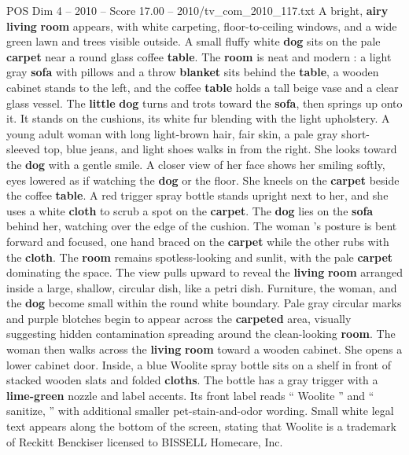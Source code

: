 \begin{textsample}{POS Dim 4 – 2010 – Score 17.00 – 2010/tv\_com\_2010\_117.txt}  \label{ex:f4_pos_029}
A bright, \textbf{airy} \textbf{living} \textbf{room} appears, with white carpeting, floor-to-ceiling windows, and a wide green lawn and trees visible outside.
A small fluffy white \textbf{dog} sits on the pale \textbf{carpet} near a round glass coffee \textbf{table}.
The \textbf{room} is neat and modern : a light gray \textbf{sofa} with pillows and a throw \textbf{blanket} sits behind the \textbf{table}, a wooden cabinet stands to the left, and the coffee \textbf{table} holds a tall beige vase and a clear glass vessel.
The \textbf{little} \textbf{dog} turns and trots toward the \textbf{sofa}, then springs up onto it.
It stands on the cushions, its white fur blending with the light upholstery.
A young adult woman with long light-brown hair, fair skin, a pale gray short-sleeved top, blue jeans, and light shoes walks in from the right.
She looks toward the \textbf{dog} with a gentle smile.
A closer view of her face shows her smiling softly, eyes lowered as if watching the \textbf{dog} or the floor.
She kneels on the \textbf{carpet} beside the coffee \textbf{table}.
A red trigger spray bottle stands upright next to her, and she uses a white \textbf{cloth} to scrub a spot on the \textbf{carpet}.
The \textbf{dog} lies on the \textbf{sofa} behind her, watching over the edge of the cushion.
The woman ’s posture is bent forward and focused, one hand braced on the \textbf{carpet} while the other rubs with the \textbf{cloth}.
The \textbf{room} remains spotless-looking and sunlit, with the pale \textbf{carpet} dominating the space.
The view pulls upward to reveal the \textbf{living} \textbf{room} arranged inside a large, shallow, circular dish, like a petri dish.
Furniture, the woman, and the \textbf{dog} become small within the round white boundary.
Pale gray circular marks and purple blotches begin to appear across the \textbf{carpeted} area, visually suggesting hidden contamination spreading around the clean-looking \textbf{room}.
The woman then walks across the \textbf{living} \textbf{room} toward a wooden cabinet.
She opens a lower cabinet door.
Inside, a blue Woolite spray bottle sits on a shelf in front of stacked wooden slats and folded \textbf{cloths}.
The bottle has a gray trigger with a \textbf{lime-green} nozzle and label accents.
Its front label reads “ Woolite ” and “ sanitize, ” with additional smaller pet-stain-and-odor wording.
Small white legal text appears along the bottom of the screen, stating that Woolite is a trademark of Reckitt Benckiser licensed to BISSELL Homecare, Inc.

\end{textsample}
